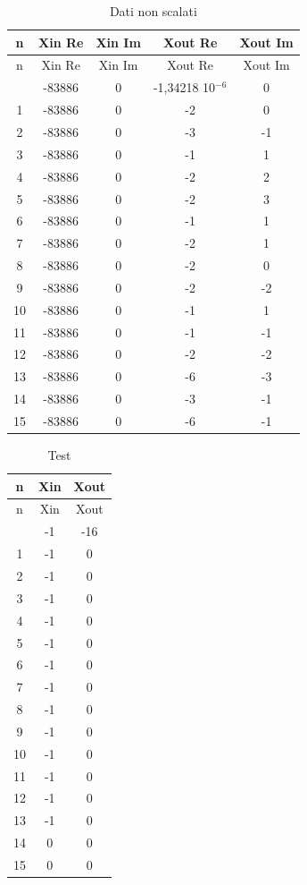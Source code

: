 \documentclass[a4paper, titlepage]{article}
\begin{document}
\begin{longtable}{*5c}
\caption{Dati non scalati}
\label{}\\
\toprule
n & Xin Re & Xin Im & Xout Re & Xout Im \\
\midrule
\endfirsthead
n & Xin Re & Xin Im & Xout Re & Xout Im \\
\midrule
\endhead
\midrule
\endfoot
\bottomrule
\endlastfoot
0 & -83886 & 0 & -1,34218 10$^{-6}$ & 0\\
1 & -83886    & 0 & -2 & 0 \\
2 & -83886    & 0 & -3 & -1 \\
3 & -83886    & 0 & -1 & 1 \\
4 & -83886    & 0 & -2 & 2 \\
5 & -83886    & 0 & -2 & 3 \\
6 & -83886    & 0 & -1 & 1 \\
7 & -83886    & 0 & -2 & 1 \\
8 & -83886    & 0 & -2 & 0 \\
9 & -83886    & 0 & -2 & -2 \\
10& -83886    & 0 & -1 & 1 \\
11& -83886    & 0 & -1 & -1 \\
12& -83886    & 0 & -2 & -2 \\
13& -83886    & 0 & -6 & -3 \\
14& -83886    & 0 & -3 & -1 \\
15 & -83886 & 0 & -6 & -1 \\ 
\end{longtable}
\newpage
\begin{longtable}{*3c}
\caption{Test}
\label{}\\
\toprule
n & Xin & Xout\\
\midrule
\endfirsthead
n & Xin & Xout\\
\midrule
\endhead
\midrule
\endfoot
\bottomrule
\endlastfoot
0 & -1& -16\\
1 & -1& 0\\
2 & -1& 0\\
3 & -1& 0\\
4 & -1& 0\\
5 & -1& 0\\
6 & -1& 0\\
7 & -1& 0 \\
8 & -1& 0 \\
9 & -1& 0\\
10& -1& 0\\
11& -1& 0\\
12& -1& 0\\
13& -1& 0\\
14& 0& 0\\
15& 0& 0\\ 
\end{longtable}
\end{document}
